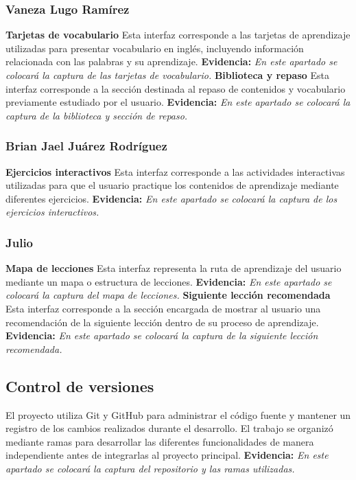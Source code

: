 \subsubsection{Vaneza Lugo Ramírez}
\textbf{Tarjetas de vocabulario}
Esta interfaz corresponde a las tarjetas de aprendizaje utilizadas para
presentar vocabulario en inglés, incluyendo información relacionada con
las palabras y su aprendizaje.
\textbf{Evidencia:}
\textit{En este apartado se colocará la captura de las tarjetas de
vocabulario.}
\vspace{0.5cm}
\textbf{Biblioteca y repaso}
Esta interfaz corresponde a la sección destinada al repaso de contenidos
y vocabulario previamente estudiado por el usuario.
\textbf{Evidencia:}
\textit{En este apartado se colocará la captura de la biblioteca y sección
de repaso.}
\subsubsection{Brian Jael Juárez Rodríguez}
\textbf{Ejercicios interactivos}
Esta interfaz corresponde a las actividades interactivas utilizadas para
que el usuario practique los contenidos de aprendizaje mediante diferentes
ejercicios.
\textbf{Evidencia:}
\textit{En este apartado se colocará la captura de los ejercicios
interactivos.}
\subsubsection{Julio}
\textbf{Mapa de lecciones}
Esta interfaz representa la ruta de aprendizaje del usuario mediante un
mapa o estructura de lecciones.
\textbf{Evidencia:}
\textit{En este apartado se colocará la captura del mapa de lecciones.}
\vspace{0.5cm}
\textbf{Siguiente lección recomendada}
Esta interfaz corresponde a la sección encargada de mostrar al usuario una
recomendación de la siguiente lección dentro de su proceso de aprendizaje.
\textbf{Evidencia:}
\textit{En este apartado se colocará la captura de la siguiente lección
recomendada.}
\subsection{Control de versiones}
El proyecto utiliza Git y GitHub para administrar el código fuente y
mantener un registro de los cambios realizados durante el desarrollo.
El trabajo se organizó mediante ramas para desarrollar las diferentes
funcionalidades de manera independiente antes de integrarlas al proyecto
principal.
\textbf{Evidencia:}
\textit{En este apartado se colocará la captura del repositorio y las ramas
utilizadas.}
